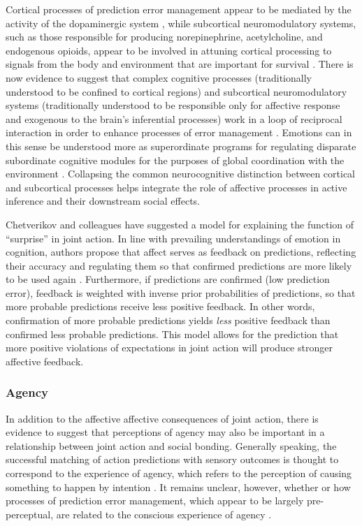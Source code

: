 \begin{CJK}{UTF8}{gbsn}
Cortical processes of prediction error management appear to be mediated by the activity of the dopaminergic system \citep{Schultz2016}, while subcortical neuromodulatory systems, such as those responsible for producing norepinephrine, acetylcholine, and endogenous opioids, appear to be involved in attuning cortical processing to signals from the body and environment that are important for survival \citep{Lewis2005}.  There is now evidence to suggest that complex cognitive processes (traditionally understood to be confined to cortical regions) and subcortical neuromodulatory systems (traditionally understood to be responsible only for affective response and exogenous to the brain's inferential processes) work in a loop of reciprocal interaction in order to enhance processes of error management \citep{Damasio1994,Lewis2005,Miller2017,Barrett2017}.
Emotions can in this sense be understood more as superordinate programs for regulating disparate subordinate cognitive modules for the purposes of global coordination with the environment \citep{Cosmides2000}.  Collapsing the common neurocognitive distinction between cortical and subcortical processes helps integrate the role of affective processes in active inference and their downstream social effects.

Chetverikov \textcite{Chetverikov2016} and colleagues have suggested a model for explaining the function of ``surprise'' in joint action.  In line with prevailing understandings of emotion in cognition, authors propose that affect serves as feedback on predictions, reflecting their accuracy and regulating them so that confirmed predictions are more likely to be used again \citep{Chetverikov2014}.  Furthermore, if predictions are confirmed (low prediction error), feedback is weighted with inverse prior probabilities of predictions, so that more probable predictions receive less positive feedback. In other words, confirmation of more probable predictions yields \textit{less} positive feedback than confirmed less probable predictions.  This model allows for the prediction that more positive violations of expectations in joint action will produce stronger affective feedback.

\subsubsection{Agency}
In addition to the affective affective consequences of joint action, there is evidence to suggest that perceptions of agency may also be important in a relationship between joint action and social bonding. Generally speaking, the successful matching of action predictions with sensory outcomes is thought to correspond to the experience of agency, which refers to the perception of causing something to happen by intention \citep{Frith2007,Pacherie2012,Obhi2011}.  It remains unclear, however, whether or how processes of prediction error management, which appear to be largely pre-perceptual, are related to the conscious experience of agency \citep{Pesquita2017}.


\end{CJK}
